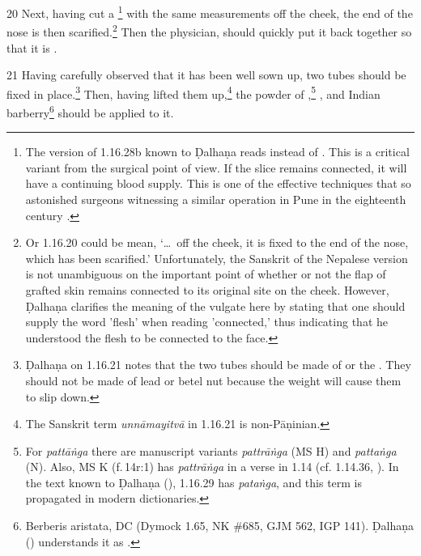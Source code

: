 \begin{translation}
    \item[20] Next, having cut a \footnote{The
    version of 1.16.28b known to Ḍalhaṇa \citep[81]{vulgate} reads  instead of .
    This is a critical variant from the surgical point of view.  If the slice remains
    connected, it will have a continuing blood supply.  This is one of the effective 
    techniques that so astonished surgeons witnessing a similar operation in Pune in
    the eighteenth century \citep[see][67--70]{wuja-2003}.} with the same
    measurements off the cheek, the end of the nose is then scarified.\footnote{Or 1.16.20 could be mean, 
    `\ldots\ off the cheek, it is fixed to the end of the nose, which has been
    scarified.' Unfortunately, the Sanskrit of the Nepalese version is not unambiguous on the
    important point of whether or not the flap of grafted skin remains connected
    to its original site on the cheek. However, Ḍalhaṇa \citep[81]{vulgate} clarifies the meaning of the vulgate here by stating that one should supply the word 'flesh' when reading 'connected,' thus indicating that he understood the flesh to be connected to the face.} %
%
Then the  physician, 
    should quickly put it back together so that it is 
    .
    
    \item[21] 
    Having carefully observed that it has been well sown up,
    two tubes should be fixed in place.\footnote{Ḍalhaṇa on 1.16.21 \citep[81]{vulgate} notes that the two tubes should be made of  or the . They should not be made of lead or betel nut because the weight will cause them to slip down.} Then, having lifted them up,\footnote{The 
    Sanskrit term \emph{unnāmayitvā} in 1.16.21 is non-Pāṇinian.}
    the powder of
    ,\footnote{For \emph{pattāṅga} there are manuscript variants 
    \emph{pattrāṅga} (MS H) and \emph{pattaṅga}    (N).  Also, MS K (f.\,14r:1) has \emph{pattrāṅga} in a verse in 1.14 (cf. 1.14.36, \cite[66]{vulgate}). In the text known to Ḍalhaṇa (\cite[81]{vulgate}), 1.16.29 has \emph{pataṅga}, and this term is propagated in modern dictionaries.}
    ,
    and
    Indian barberry\footnote{Berberis aristata, DC (Dymock 1.65, NK
        \#685, GJM 562, IGP 141). Ḍalhaṇa (\cite[81]{vulgate}) understands it as .}
    should be applied to it.
    

\end{translation}
